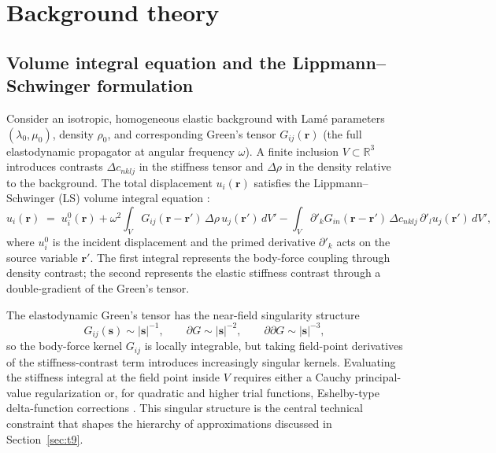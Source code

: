 \documentclass[11pt,a4paper]{article}
\newcommand{\D}{\Delta}
\newcommand{\bs}{\bm{s}}
\newcommand{\br}{\bm{r}}
\theoremstyle{plain}
\theoremstyle{definition}
\theoremstyle{remark}
\begin{document}
\section{Background theory}\label{sec:background}

\subsection{Volume integral equation and the Lippmann--Schwinger formulation}
\label{sec:ls}

Consider an isotropic, homogeneous elastic background with Lam\'{e}
parameters $(\lambda_0,\mu_0)$, density $\rho_0$, and corresponding
Green's tensor $G_{ij}(\br)$ (the full elastodynamic propagator at
angular frequency $\omega$).  A finite inclusion $V\subset\mathbb{R}^3$
introduces contrasts $\D c_{nklj}$ in the stiffness tensor and $\D\rho$
in the density relative to the background.  The total displacement
$u_i(\br)$ satisfies the Lippmann--Schwinger (LS) volume integral
equation \cite{mura1987}:
\begin{equation}
  u_i(\br) \;=\; u_i^{0}(\br)
    + \omega^2\!\int_V G_{ij}(\br - \br')\,\D\rho\, u_j(\br')\,dV'
    - \int_V \partial'_k G_{in}(\br - \br')\,\D c_{nklj}\,
      \partial'_l u_j(\br')\,dV',
  \label{eq:LS}
\end{equation}
where $u_i^0$ is the incident displacement and the primed derivative
$\partial'_k$ acts on the source variable $\br'$.  The first integral
represents the body-force coupling through density contrast; the second
represents the elastic stiffness contrast through a double-gradient of
the Green's tensor.

The elastodynamic Green's tensor has the near-field singularity
structure
\begin{equation}
  G_{ij}(\bs) \sim |\bs|^{-1}, \qquad
  \partial G \sim |\bs|^{-2}, \qquad
  \partial\partial G \sim |\bs|^{-3},
  \label{eq:singularities}
\end{equation}
so the body-force kernel $G_{ij}$ is locally integrable, but taking
field-point derivatives of the stiffness-contrast term introduces
increasingly singular kernels.  Evaluating the stiffness integral at
the field point inside $V$ requires either a Cauchy principal-value
regularization or, for quadratic and higher trial functions, Eshelby-type
delta-function corrections \cite{eshelby1957}.  This singular structure
is the central technical constraint that shapes the hierarchy of
approximations discussed in Section~\ref{sec:t9}.
\end{document}
